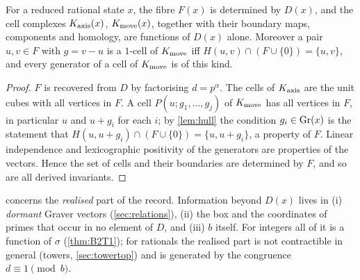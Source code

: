 \begin{theorem}\label{thm:R3T1a}
For a reduced rational state $x$, the fibre $F(x)$ is determined by $D(x)$, and the cell complexes $K_{\mathrm{axis}}(x)$, $K_{\mathrm{move}}(x)$, together with their boundary maps, components and homology, are functions of $D(x)$ alone. Moreover a pair $u,v\in F$ with $g=v-u$ is a $1$-cell of $K_{\mathrm{move}}$ iff $H(u,v)\cap(F\cup\{0\})=\{u,v\}$, and every generator of a cell of $K_{\mathrm{move}}$ is of this kind.
\end{theorem}
\begin{proof}
$F$ is recovered from $D$ by factorising $d=p^\alpha$. The cells of $K_{\mathrm{axis}}$ are the unit cubes with all vertices in $F$. A cell $P(u;g_1,\dots,g_j)$ of $K_{\mathrm{move}}$ has all vertices in $F$, in particular $u$ and $u+g_i$ for each $i$; by \cref{lem:hull} the condition $g_i\in\mathrm{Gr}(x)$ is the statement that $H(u,u+g_i)\cap(F\cup\{0\})=\{u,u+g_i\}$, a property of $F$. Linear independence and lexicographic positivity of the generators are properties of the vectors. Hence the set of cells and their boundaries are determined by $F$, and so are all derived invariants. \qedhere
\end{proof}
\begin{remark}\label{rem:beyond}
 concerns the \emph{realised} part of the record. Information beyond $D(x)$ lives in (i) \emph{dormant} Graver vectors (\cref{sec:relations}), (ii) the box and the coordinates of primes that occur in no element of $D$, and (iii) $b$ itself. For integers all of it is a function of $\sigma$ (\cref{thm:B2T1}); for rationals the realised part is not contractible in general (towers, \cref{sec:towertop}) and is generated by the congruence $d\equiv1\pmod b$.
\end{remark}

